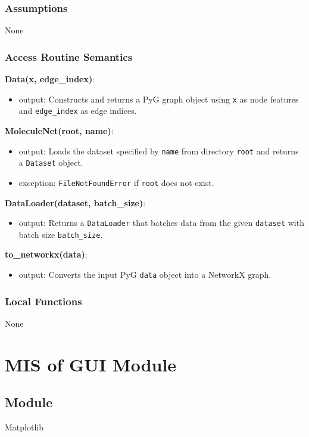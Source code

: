 \documentclass[12pt, titlepage]{article}
\begin{document}
\subsubsection{Assumptions}
None

\subsubsection{Access Routine Semantics}

\textbf{Data(x, edge\_index)}:
\begin{itemize}
  \item output: Constructs and returns a PyG graph object using \texttt{x} as node features and \texttt{edge\_index} as edge indices.
\end{itemize}

\textbf{MoleculeNet(root, name)}:
\begin{itemize}
  \item output: Loads the dataset specified by \texttt{name} from directory \texttt{root} and returns a \texttt{Dataset} object.
  \item exception: \texttt{FileNotFoundError} if \texttt{root} does not exist.
\end{itemize}

\textbf{DataLoader(dataset, batch\_size)}:
\begin{itemize}
  \item output: Returns a \texttt{DataLoader} that batches data from the given \texttt{dataset} with batch size \texttt{batch\_size}.
\end{itemize}

\textbf{to\_networkx(data)}:
\begin{itemize}
  \item output: Converts the input PyG \texttt{data} object into a NetworkX graph.
\end{itemize}

\subsubsection{Local Functions}
None

\newpage


\section{MIS of GUI Module} \label{MatplotlibGUI}

\subsection{Module}
Matplotlib
\end{document}
